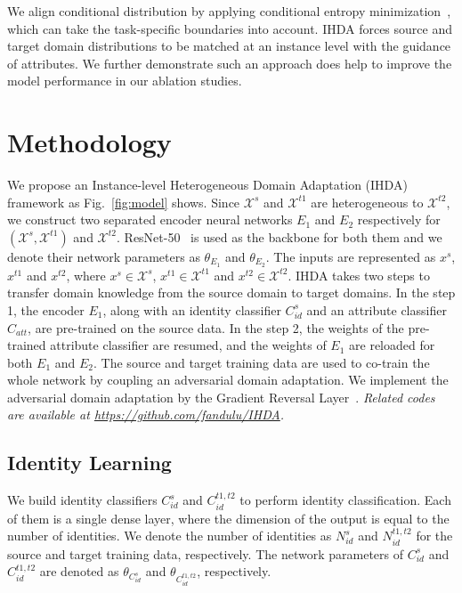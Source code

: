 \documentclass[journal]{IEEEtran}
\begin{document}
We align conditional distribution by applying conditional entropy minimization~\cite{grandvalet2005semi,saito2019semi}, which can take the task-specific boundaries into account. IHDA forces source and target domain distributions to be matched at an instance level with the guidance of attributes. We further demonstrate such an approach does help to improve the model performance in our ablation studies.


\section{Methodology}
\label{sec:methodology}

We propose an Instance-level Heterogeneous Domain Adaptation (IHDA) framework as Fig.~\ref{fig:model} shows. Since $\mathcal{X}^{s}$ and $\mathcal{X}^{t1}$ are heterogeneous to $\mathcal{X}^{t2}$, we construct two separated encoder neural networks $E_{1}$ and $E_{2}$ respectively for $(\mathcal{X}^{s}, \mathcal{X}^{t1})$ and $\mathcal{X}^{t2}$. ResNet-50~\cite{he2016deep} is used as the backbone for both them and we denote their network parameters as $\theta_{E_{1}}$ and $\theta_{E_{2}}$. The inputs are represented as $x^{s}$, $x^{t1}$ and $x^{t2}$, where $x^{s} \in \mathcal{X}^{s}$, $x^{t1} \in \mathcal{X}^{t1}$ and $x^{t2} \in \mathcal{X}^{t2}$. IHDA takes two steps to transfer domain knowledge from the source domain to target domains. In the step 1, the encoder $E_{1}$, along with an identity classifier $C^{s}_{id}$ and an attribute classifier $C_{att}$, are pre-trained on the source data. In the step 2, the weights of the pre-trained attribute classifier are resumed, and the weights of $E_{1}$ are reloaded for both $E_{1}$ and $E_{2}$. The source and target training data are used to co-train the whole network by coupling an adversarial domain adaptation. We implement the adversarial domain adaptation by the Gradient Reversal Layer~\cite{ganin2015unsupervised}. \emph{Related codes are available at \url{https://github.com/fandulu/IHDA}.}




\subsection{Identity Learning}

We build identity classifiers $C^{s}_{id}$ and $C^{t1,t2}_{id}$ to perform identity classification. Each of them is a single dense layer, where the dimension of the output is equal to the number of identities. We denote the number of identities as $N^{s}_{id}$ and $N^{t1,t2}_{id}$ for the source and target training data, respectively. The network parameters of $C^{s}_{id}$ and $C^{t1,t2}_{id}$ are denoted as $\theta_{C^{s}_{id}}$ and $\theta_{C^{t1,t2}_{id}}$, respectively.
\end{document}
